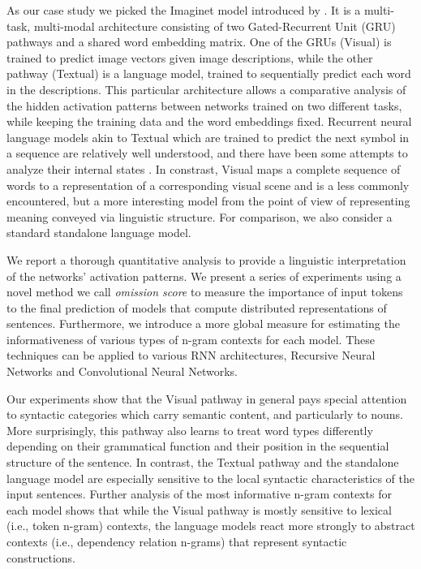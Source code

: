 As our case study we picked the {\sc Imaginet} model introduced by \label{explainimaginet}
\cite{chrupala2015learning}. It is a multi-task, multi-modal
architecture consisting of two Gated-Recurrent Unit (GRU)
\citep{cho2014properties,chung2014empirical} pathways and
a shared word embedding matrix. One of the GRUs ({\sc Visual}) is
trained to predict image vectors given image descriptions, while the other
pathway ({\sc Textual}) is a language model, trained to sequentially predict each
word in the descriptions. This particular
architecture allows a comparative analysis of the hidden activation
patterns between networks trained on two different tasks, while
keeping the training data and the word embeddings fixed. Recurrent neural
language models akin to {\sc Textual} which are trained to predict the
next symbol in a sequence are relatively well understood, and there
have been some attempts to analyze their internal states
\citep[among others]{elman1991distributed,karpathy2015visualizing}. In
constrast, {\sc Visual} maps a complete sequence of words to
a representation of a corresponding visual scene and is a less
commonly encountered, but a more interesting model from the point of
view of representing meaning conveyed via linguistic structure.
For comparison, we also consider a standard standalone language model.

We report a thorough quantitative analysis to provide a linguistic
interpretation of the networks' activation patterns. We present a
series of experiments using a novel method we call \emph{omission score}
to measure the importance of input tokens to the final prediction of models
that compute distributed representations of sentences.
Furthermore, we introduce a more global measure for estimating the
informativeness of various types of n-gram contexts for each model.
These techniques can be applied to various RNN architectures, Recursive
Neural Networks and Convolutional Neural Networks.

Our experiments show that the {\sc Visual} pathway in general
pays special attention to syntactic categories which carry semantic
content, and particularly to nouns. More surprisingly, this pathway also
learns to treat word types differently depending on their
grammatical function and their position in the sequential structure of
the sentence. In contrast, the {\sc Textual} pathway and the standalone
language model are especially sensitive to the local syntactic
characteristics of the input sentences.  Further analysis of the most
informative n-gram contexts for each model shows that while the
{\sc Visual} pathway is mostly sensitive to lexical (i.e., token n-gram)
contexts, the language models react more strongly to abstract contexts
(i.e., dependency relation n-grams) that represent syntactic constructions.
